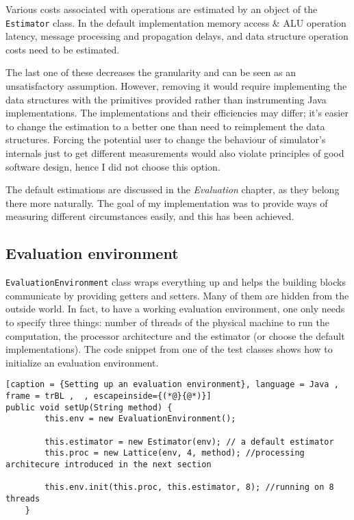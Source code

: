 \documentclass[12pt,a4paper,oneside,openright]{report}
\begin{document}
Various costs associated with operations are estimated by an object of the \texttt{Estimator} class. In the default implementation memory access \& ALU operation latency, message processing and propagation delays, and data structure operation costs need to be estimated. 

The last one of these decreases the granularity and can be seen as an unsatisfactory assumption. However, removing it would require implementing the data structures with the primitives provided rather than instrumenting Java implementations. The implementations and their efficiencies may differ; it's easier to change the estimation to a better one than need to reimplement the data structures. Forcing the potential user to change the behaviour of simulator's internals just to get different measurements would also violate principles of good software design, hence I did not choose this option.

The default estimations are discussed in the \textit{Evaluation} chapter, as they belong there more naturally. The goal of my implementation was to provide ways of measuring different circumstances easily, and this has been achieved.

\subsection{Evaluation environment}
\texttt{EvaluationEnvironment} class wraps everything up and helps the building blocks communicate by providing getters and setters. Many of them are hidden from the outside world. In fact, to have a working evaluation environment, one only needs to specify three things: number of threads of the physical machine to run the computation, the processor architecture and the estimator (or choose the default implementations). The code snippet from one of the test classes shows how to initialize an evaluation environment. 

\begin{lstlisting}[caption = {Setting up an evaluation environment}, language = Java , frame = trBL ,  , escapeinside={(*@}{@*)}]
public void setUp(String method) {
        this.env = new EvaluationEnvironment();

        this.estimator = new Estimator(env); // a default estimator
        this.proc = new Lattice(env, 4, method); //processing architecure introduced in the next section

        this.env.init(this.proc, this.estimator, 8); //running on 8 threads
    }

\end{lstlisting}
\end{document}
